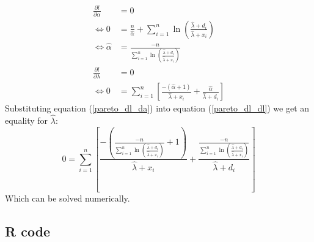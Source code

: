 \documentclass{article}
\begin{document}
	\begin{align}
		\frac{\partial l}{\partial\alpha}&=0 \nonumber\\
		\Leftrightarrow 0 &= \frac{n}{\hat{\alpha}} +\sum_{i=1}^{n}\ln\left(\frac{\hat{\lambda} + d_i}{\hat{\lambda}+x_i}\right) \nonumber\\
		\Leftrightarrow \hat{\alpha} &= \frac{-n}{\sum_{i=1}^{n}\ln\left(\frac{\hat{\lambda} + d_i}{\hat{\lambda}+x_i}\right)}\\
		\frac{\partial l}{\partial\lambda} &=0 \nonumber \\
		\Leftrightarrow 0 & =\sum_{i=1}^{n}\left[\frac{-(\hat{\alpha}+1)}{\hat{\lambda}+x_i}+\frac{\hat{\alpha}}{\hat{\lambda}+d_i}\right] \label{pareto_dl_dl}
	\end{align}
	Substituting equation (\ref{pareto_dl_da}) into equation (\ref{pareto_dl_dl}) we get an equality for $\hat{\lambda}$:
	$$0 = \sum_{i=1}^{n} \left[\frac{-\left(\frac{-n}{\sum_{i=1}^{n}\ln\left(\frac{\hat{\lambda} + d_i}{\hat{\lambda}+x_i}\right)}+1\right)}{\hat{\lambda}+x_i}+\frac{\frac{-n}{\sum_{i=1}^{n}\ln\left(\frac{\hat{\lambda} + d_i}{\hat{\lambda}+x_i}\right)}}{\hat{\lambda}+d_i}\right] $$
	Which can be solved numerically.
	
	\subsection{R code}
\end{document}
